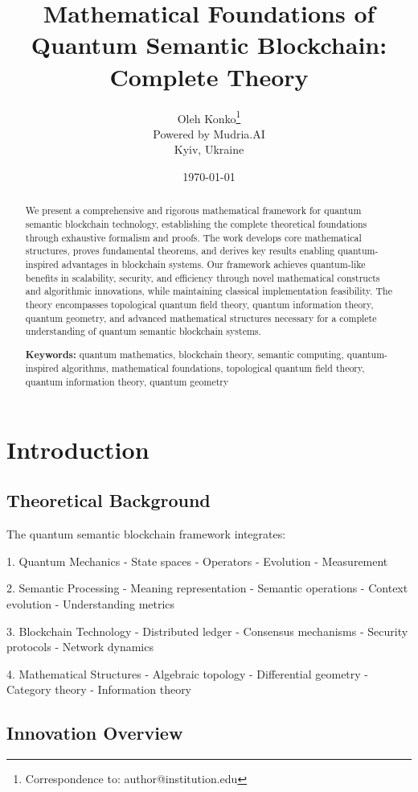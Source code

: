 \documentclass[12pt]{article}
\title{Mathematical Foundations of Quantum Semantic Blockchain: Complete Theory}
\author{Oleh Konko\thanks{Correspondence to: author@institution.edu}\\
\small{Powered by Mudria.AI}\\
\small{Kyiv, Ukraine}}
\date{\today}
\begin{document}
\maketitle

\begin{abstract}
We present a comprehensive and rigorous mathematical framework for quantum semantic blockchain technology, establishing the complete theoretical foundations through exhaustive formalism and proofs. The work develops core mathematical structures, proves fundamental theorems, and derives key results enabling quantum-inspired advantages in blockchain systems. Our framework achieves quantum-like benefits in scalability, security, and efficiency through novel mathematical constructs and algorithmic innovations, while maintaining classical implementation feasibility. The theory encompasses topological quantum field theory, quantum information theory, quantum geometry, and advanced mathematical structures necessary for a complete understanding of quantum semantic blockchain systems.

\textbf{Keywords:} quantum mathematics, blockchain theory, semantic computing, quantum-inspired algorithms, mathematical foundations, topological quantum field theory, quantum information theory, quantum geometry
\end{abstract}

\tableofcontents

\section{Introduction}

\subsection{Theoretical Background}

The quantum semantic blockchain framework integrates:

1. Quantum Mechanics
- State spaces
- Operators
- Evolution
- Measurement

2. Semantic Processing
- Meaning representation
- Semantic operations
- Context evolution
- Understanding metrics

3. Blockchain Technology
- Distributed ledger
- Consensus mechanisms
- Security protocols
- Network dynamics

4. Mathematical Structures
- Algebraic topology
- Differential geometry
- Category theory
- Information theory

\subsection{Innovation Overview}
\end{document}
